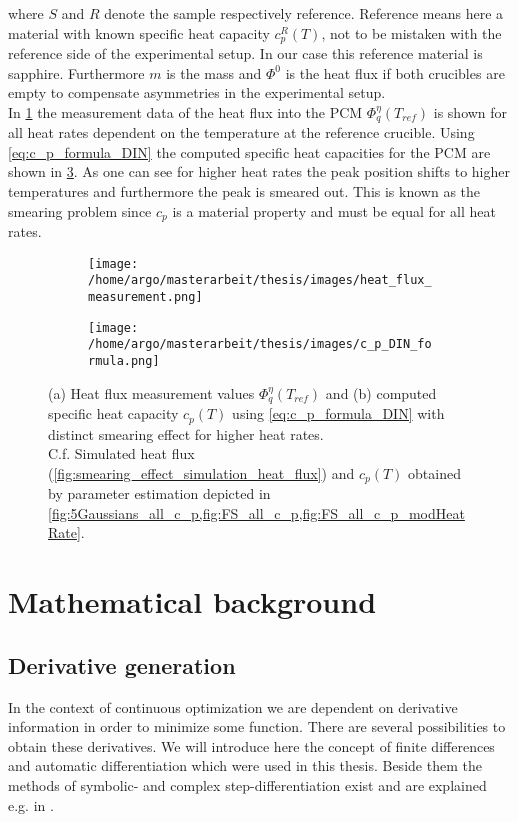 \documentclass{scrartcl}[12pt, halfparskip]
\numberwithin{equation}{section}
\numberwithin{figure}{section}
\numberwithin{table}{section}
\begin{document}
where $S$ and $R$ denote the sample respectively reference. Reference means here a material with known specific heat capacity $c_p^R(T)$, not to be mistaken with the reference side of the experimental setup. In our case this reference material is sapphire. Furthermore $m$ is the mass and $\Phi^0$ is the heat flux if both crucibles are empty to compensate asymmetries in the experimental setup. \\
In \cref{fig:heat_flux_measurements} the measurement data of the heat flux into the PCM $\varPhi_q^{\eta}(T_{ref})$ is shown for all heat rates dependent on the temperature at the reference crucible. Using \cref{eq:c_p_formula_DIN} the computed specific heat capacities for the PCM are shown in \cref{fig:c_p_DIN_formula}. As one can see for higher heat rates the peak position shifts to higher temperatures and furthermore the peak is smeared out. This is known as the smearing problem since $c_p$ is a material property and must be equal for all heat rates.


\begin{figure}[H]
	\centering
	\begin{subfigure}{0.7\textwidth}
		\texttt{[image: /home/argo/masterarbeit/thesis/images/heat\_flux\_measurement.png]}
		\caption{}
		\label{fig:heat_flux_measurements}
	\end{subfigure}
	\begin{subfigure}{0.7\textwidth}
		\texttt{[image: /home/argo/masterarbeit/thesis/images/c\_p\_DIN\_formula.png]}
		\caption{}
		\label{fig:c_p_DIN_formula}
	\end{subfigure}
	\caption{(a) Heat flux measurement values $\varPhi_q^{\eta}(T_{ref})$ and (b) computed specific heat capacity $c_p(T)$ using \cref{eq:c_p_formula_DIN} with distinct smearing effect for higher heat rates. \\
	C.f. Simulated heat flux (\cref{fig:smearing_effect_simulation_heat_flux}) and $c_p(T)$ obtained by parameter estimation depicted in \cref{fig:5Gaussians_all_c_p,fig:FS_all_c_p,fig:FS_all_c_p_modHeatRate}.}
\end{figure}


\newpage
\section{Mathematical background}

\subsection{Derivative generation}
In the context of continuous optimization we are dependent on derivative information in order to minimize some function. 
There are several possibilities to obtain these derivatives. We will introduce here the concept of finite differences and automatic differentiation which were used in this thesis. 
Beside them the methods of symbolic- and complex step-differentiation exist and are explained e.g. in \cite{diss_jan}.
\end{document}

